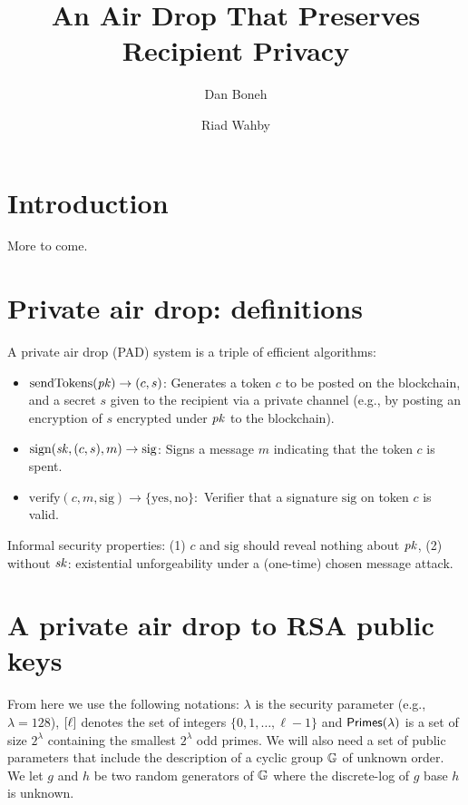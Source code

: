 \documentclass[11pt]{article}
\begin{document}
\title{An Air Drop That Preserves Recipient Privacy}
\author{Dan Boneh \and Riad Wahby}

\maketitle

\begin{abstract}
\end{abstract}

\section{Introduction}

More to come.


\section{Private air drop: definitions}


A private air drop (PAD) system is a triple of efficient algorithms:
\begin{itemize}
\item $\text{sendTokens}(\mathit{pk}) \to (c, s)$:
Generates a token $c$ to be posted on the blockchain,
and a secret $s$ given to the recipient via a private channel
(e.g., by posting an encryption of $s$ encrypted under $\mathit{pk}$ 
to the blockchain). 

\item $\text{sign}(\mathit{sk}, (c, s), m) \to \text{sig}$:
Signs a message $m$ indicating that the token $c$ is spent.

\item $\text{verify}(c, m, \text{sig}) \to \{\text{yes},\text{no}\}:$
Verifier that a signature $\text{sig}$ on token $c$ is valid.
\end{itemize}

Informal security properties: 
(1) $c$ and $\text{sig}$ should reveal nothing about $\mathit{pk}$,
(2) without $\mathit{sk}$: existential unforgeability under a 
(one-time) chosen message attack.



\section{A private air drop to RSA public keys}

From here we use the following notations:
$\lambda$ is the security parameter (e.g., $\lambda = 128$), 
$[{\ell}]$ denotes the set of integers $\{0,1,\ldots,\ell-1\}$ and 
$\textsf{Primes}(\lambda)$ is a set of size $2^\lambda$ 
containing the smallest $2^\lambda$ odd primes. 
%
We will also need a set of public parameters that include the description
of a cyclic group $\mathbb G$ of unknown order.  We let $g$ and $h$ be two
random generators of $\mathbb G$ where the discrete-log of $g$ base $h$ is unknown. 
\end{document}
